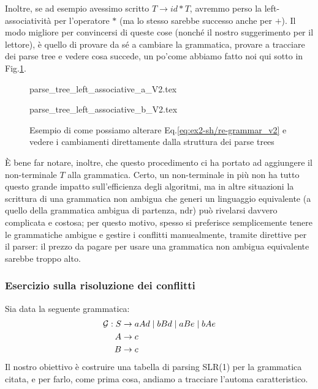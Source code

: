 \documentclass[class=book, crop=false, oneside, 12pt]{standalone}
\begin{document}
Inoltre, se ad esempio avessimo scritto \(T \to id * T\), avremmo perso la left-associatività per l'operatore \(\ast\) (ma lo stesso sarebbe successo anche per \(+\)). Il modo migliore per convincersi di queste cose (nonché il nostro suggerimento per il lettore), è quello di provare da sé a cambiare la grammatica, provare a tracciare dei parse tree e vedere cosa succede, un po'come abbiamo fatto noi qui sotto in Fig.\ref{fig:ex2-sh_re-altgrm-ptree}.
\begin{figure}[H]
    \begin{minipage}[b]{.4\textwidth}
        \centering
        {parse_tree_left_associative_a_V2.tex}
        \label{fig:ex2-sh_re-altgrm-ptree_1}
    \end{minipage}
    \hfill
    \begin{minipage}[b]{.4\textwidth}
        \centering
        {parse_tree_left_associative_b_V2.tex}
        \label{fig:ex2-sh_re-altgrm-ptree_2}
    \end{minipage}
    \caption{Esempio di come possiamo alterare Eq.\ref{eq:ex2-sh/re-grammar_v2} e vedere i cambiamenti direttamente dalla struttura dei parse trees}
    \label{fig:ex2-sh_re-altgrm-ptree}
\end{figure}

È bene far notare, inoltre, che questo procedimento ci ha portato ad aggiungere il non-terminale \(T\) alla grammatica. Certo, un non-terminale in più non ha tutto questo grande impatto sull'efficienza degli algoritmi, ma in altre situazioni la scrittura di una grammatica non ambigua che generi un linguaggio equivalente (a quello della grammatica ambigua di partenza, ndr) può rivelarsi davvero complicata e costosa; per questo motivo, spesso si preferisce semplicemente tenere le grammatiche ambigue e gestire i conflitti manuealmente, tramite direttive per il parser: il prezzo da pagare per usare una grammatica non ambigua equivalente sarebbe troppo alto.

\subsubsection{Esercizio sulla risoluzione dei conflitti}
Sia data la seguente grammatica:
\begin{align}
    \label{eq:ex3-slr1-grammarr}
    \mathcal{G}: S &\to aAd \mid bBd \mid aBe \mid bAe \\
    A &\to c \nonumber \\ \notag
    B &\to c \notag
\end{align}
Il nostro obiettivo è costruire una tabella di parsing SLR(1) per la grammatica citata, e per farlo, come prima cosa, andiamo a tracciare l'automa caratteristico.
\end{document}
